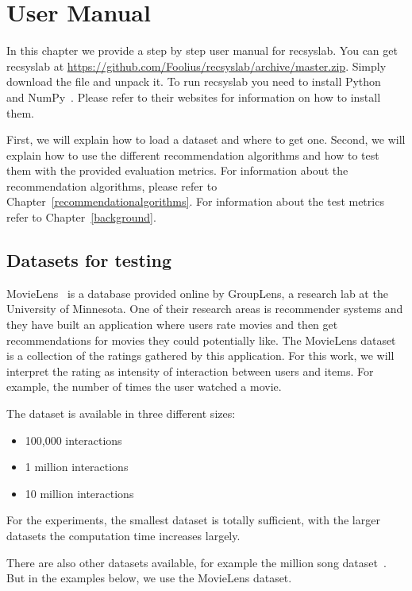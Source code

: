 \chapter{User Manual}
\label{usermanual}
In this chapter we provide a step by step user manual for recsyslab.
You can get recsyslab at \url{https://github.com/Foolius/recsyslab/archive/master.zip}.
Simply download the file and unpack it.
To run recsyslab you need to install Python~\cite{python} and NumPy~\cite{numpy}.
Please refer to their websites for information on how to install them.

First, we will explain how to load a dataset and where to get one. Second, we
will explain how to use the different recommendation algorithms and
how to test them with the provided evaluation metrics. 
For information about the recommendation algorithms, please refer to Chapter~\ref{recommendationalgorithms}.
For information about the test metrics refer to Chapter~\ref{background}.

\section{Datasets for testing}
\label{movielens}

MovieLens~\cite{movielensdatasets} is a database provided online by GroupLens, a research
lab at the University of Minnesota. One of their research areas is
recommender systems and they have built an application where users rate
movies and then get recommendations for movies they could potentially like. The
MovieLens dataset is a collection of the ratings gathered by this application. For
this work, we will interpret the rating as intensity of interaction
between users and items. For example, the number of times the user watched a movie.

The dataset is available in three different sizes:
\begin{itemize}
\item 100,000 interactions
\item 1 million interactions
\item 10 million interactions
\end{itemize}
For the experiments, the smallest dataset is totally sufficient, with
the larger datasets the computation time increases largely.

There are also other datasets available, for example the 
million song dataset~\cite{Bertin-Mahieux2011}. But in the examples below, we use the 
MovieLens dataset.

